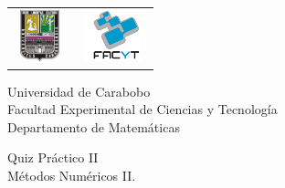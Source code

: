 \documentclass[12pt,letterpaper]{article}
\begin{document}
\begin{tabular}[h]{lr}
\includegraphics[width=1.5cm,height=1.5cm]{LogoUC.jpg} & \hspace{14cm}
\includegraphics[width=2cm,height=1.5cm]{LogoFaCyT.jpg}
\end{tabular}

\vspace{-2.5cm}
\begin{center}
{ Universidad de Carabobo \\
 \vspace{-3mm}
  Facultad Experimental de Ciencias y Tecnolog\'ia \\
 \vspace{-3mm}
Departamento de Matem\'aticas}
\\
 \vspace{1cm}

Quiz Pr\'actico II\\
M\'etodos Num\'ericos II.
\end{center}
\vspace{1cm}
\end{document}
